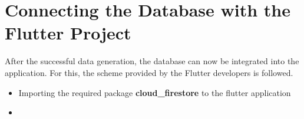 \section{Connecting the Database with the Flutter Project}
After the successful data generation, the database can now be integrated into the application. For this, the scheme provided by the Flutter developers is followed.
\begin{itemize}
	\item Importing the required package \textbf{cloud\_firestore} to the flutter application
	\item 
\end{itemize}